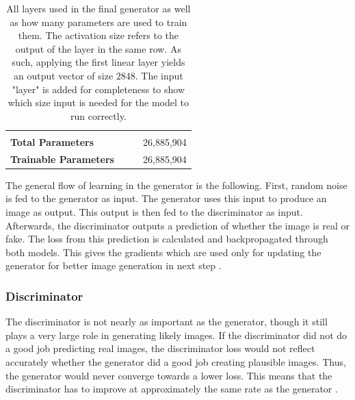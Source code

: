 \documentclass[12pt, fleqn, titlepage]{article}
\newcommand{\1}[1]{\mathds{1}\left[#1\right]}
\begin{document}
\begin{table}[H]
\begin{tabular}{llll}
		                             &                 &       &              \\
		\textbf{Total Parameters}    &                 &       & 26,885,904   \\
		\textbf{Trainable Parameters}&                 &       & 26,885,904   \\  \bottomrule
	\end{tabular}
	\caption{All layers used in the final generator as well as how many parameters are used to train them. The activation size refers to the output of the layer in the same row. As such, applying the first linear layer yields an output vector of size $2848$. The input "layer" is added for completeness to show which size input is needed for the model to run correctly.}
	\label{tab:gan_generator}
\end{table}

The general flow of learning in the generator is the following. First, random noise is fed to the generator as input. The generator uses this input to produce an image as output. This output is then fed to the discriminator as input. Afterwards, the discriminator outputs a prediction of whether the image is real or fake. The loss from this prediction is calculated and backpropagated through both models. This gives the gradients which are used only for updating the generator for better image generation in next step \cite{developers.google_generator}.

\subsubsection{Discriminator}
The discriminator is not nearly as important as the generator, though it still plays a very large role in generating likely images. If the discriminator did not do a good job predicting real images, the discriminator loss would not reflect accurately whether the generator did a good job creating plausible images. Thus, the generator would never converge towards a lower loss. This means that the discriminator has to improve at approximately the same rate as the generator \cite{developers.google_discriminator, developers.google_training}.
\end{document}
